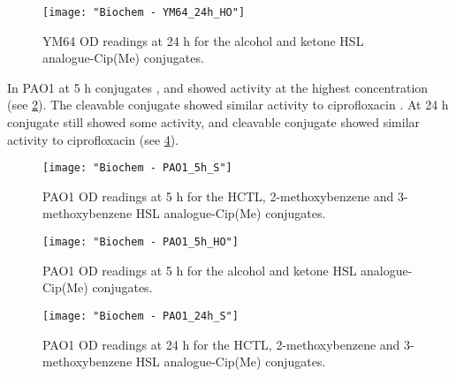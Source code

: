 \begin{figure}[H]
	\begin{center}
		\texttt{[image: "Biochem - YM64\_24h\_HO"]}
		\caption{YM64 OD readings at 24 h for the alcohol and ketone HSL analogue-Cip(Me) conjugates.\label{fgr:YM64_24h_HO}}
	\end{center}
\end{figure}



In PAO1 at 5 h conjugates ,  and  showed activity at the highest concentration (see \ref{fgr:PAO1_5h_S}). 
The cleavable conjugate  showed similar activity to ciprofloxacin .
At 24 h conjugate  still showed some activity, and
cleavable conjugate  showed similar activity to ciprofloxacin  (see \ref{fgr:PAO1_24h_S}).




\begin{figure}[H]
	\begin{center}
		\texttt{[image: "Biochem - PAO1\_5h\_S"]}
		\caption{PAO1 OD readings at 5 h for the HCTL, 2-methoxybenzene and 3-methoxybenzene HSL analogue-Cip(Me) conjugates.\label{fgr:PAO1_5h_S}}
	\end{center}
\end{figure}

\begin{figure}[H]
	\begin{center}
		\texttt{[image: "Biochem - PAO1\_5h\_HO"]}
		\caption{PAO1 OD readings at 5 h for the alcohol and ketone HSL analogue-Cip(Me) conjugates.\label{fgr:PAO1_5h_HO}}
	\end{center}
\end{figure}


\begin{figure}[H]
	\begin{center}
		\texttt{[image: "Biochem - PAO1\_24h\_S"]}
		\caption{PAO1 OD readings at 24 h for the HCTL, 2-methoxybenzene and 3-methoxybenzene HSL analogue-Cip(Me) conjugates.\label{fgr:PAO1_24h_S}}
	\end{center}
\end{figure}

